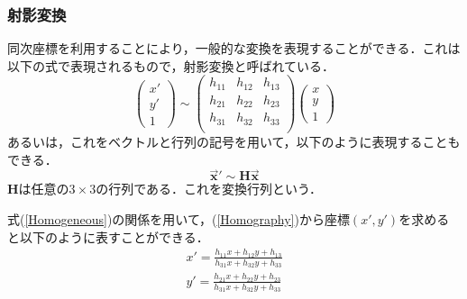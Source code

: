 \documentclass[openright]{nitocs}
\numberwithin{equation}{section}
\begin{document}
            \subsubsection{射影変換}
                同次座標を利用することにより，一般的な変換を表現することができる．これは以下の式で表現されるもので，射影変換と呼ばれている\cite{DIP}．
                \begin{equation} %
                    \left(
                        \begin{array}{ccc}
                        x'\\
                        y'\\
                        1
                        \end{array}
                    \right)\sim
                    \left(
                        \begin{array}{ccc}
                        h_{11} & h_{12} & h_{13}\\
                        h_{21} & h_{22} & h_{23}\\
                        h_{31} & h_{32} & h_{33}\\
                        \end{array}
                    \right)
                    \left(
                        \begin{array}{ccc}
                        x\\
                        y\\
                        1
                        \end{array}
                    \right)
                    \label{Homography}
                \end{equation}
                あるいは，これをベクトルと行列の記号を用いて，以下のように表現することもできる．
                \begin{equation}
                    \bm{\vec{x}'} \sim \bm{H\vec{x}}
                \end{equation}
                $\bm{H}$は任意の$3\times3$の行列である．これを変換行列という．

                式(\ref{Homogeneous})の関係を用いて，(\ref{Homography})から座標$(x',y')$を求めると以下のように表すことができる．
                \begin{equation} %
                    \begin{split} %
                        x' = \frac{h_{11}x+h_{12}y+h_{13}}{h_{31}x+h_{32}y+h_{33}} \\ 
                        y' = \frac{h_{21}x+h_{22}y+h_{23}}{h_{31}x+h_{32}y+h_{33}} \\ 
                    \end{split}
                    \label{transform_XY}
                \end{equation}
\end{document}
